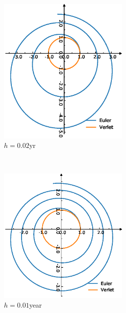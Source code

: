 \begin{figure}[tb]
	\begin{subfigure}[tb]{0.5\textwidth}
		\centering
		\includegraphics[width=0.7\textwidth]{Earth500.eps}
		\caption{$h = 0.02$yr}
		\label{fig:earth500}
	\end{subfigure}
~
	\begin{subfigure}[tb]{0.5\textwidth}
		\centering
		\includegraphics[width=0.7\textwidth]{Earth1000.eps}		\caption{$h = 0.01$year}
		\label{fig:earth1000}
	\end{subfigure}
~
	\begin{subfigure}[tb]{0.5\textwidth}
		\centering

\end{subfigure}
\end{figure}
